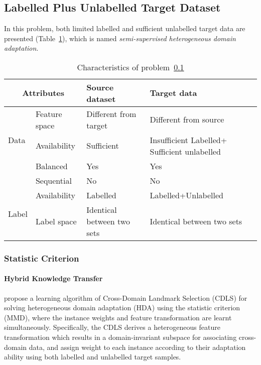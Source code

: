 \documentclass[prodmode]{acmsmall}  %
\begin{document}
\subsection{Labelled Plus Unlabelled Target Dataset}
\label{sec:HETESsemi}
In this problem, both limited labelled and sufficient unlabelled target data are presented (Table~\ref{tab:HETESsemi}), which is named \textit{semi-supervised heterogeneous domain adaptation}.
\begin{table}[htbp!]
\caption{Characteristics of problem~\ref{sec:HETESsemi}}
\label{tab:HETESsemi}
\begin{center}
\begin{small}
\begin{tabular}{|p{1cm}<{\centering}|m{2.5cm}<{\centering}|m{4.3cm}<{\centering}|m{4.3cm}<{\centering}|}
\hline
\multicolumn{2}{|c|}{Attributes} & Source dataset & Target data \\
\hline \hline
\multirow{3}{*}{Data} & Feature space & Different from target & {\color{red}Different from source} \\ 
\cline{2-4}{} & Availability & Sufficient & {\color{red}Insufficient Labelled+ Sufficient unlabelled}  \\
\cline{2-4}{} & Balanced & Yes & Yes \\
\cline{2-4}{} & Sequential & No & No \\
\hline \hline
\multirow{2}{*}{Label} & Availability & Labelled & {\color{red}Labelled+Unlabelled} \\
\cline{2-4}{}  & Label space & Identical between two sets & Identical between two sets \\ 
\hline
\end{tabular}
\end{small}
\end{center}
\end{table}
 
\subsubsection{Statistic Criterion}
\paragraph{Hybrid Knowledge Transfer}
 propose a learning algorithm of Cross-Domain Landmark Selection (CDLS) for solving heterogeneous domain adaptation (HDA) using the statistic criterion (MMD), where the instance weights and feature transformation are learnt simultaneously.
Specifically, the CDLS derives a heterogeneous feature transformation which results in a domain-invariant subspace for associating cross-domain data, and assign weight to each instance according to their adaptation ability using both labelled and unlabelled target samples.
\end{document}
